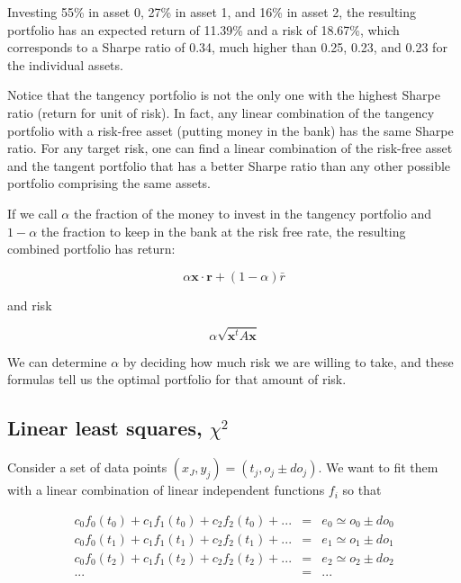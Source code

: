 \documentclass[justified, sixbynine]{tufte-book}
\theoremstyle{plain}%
\newtheorem * {corollary}{Corollary}
\theoremstyle{definition}
\theoremstyle{remark}
\newtheorem * {remark}{Remark}
\newtheorem * {note}{Note}
\begin{document}
\begin{fullwidth}
Investing 55\% in asset 0, 27\% in asset 1, and 16\% in asset 2, the resulting portfolio has an expected return of 11.39\% and a risk of 18.67\%, which corresponds to a Sharpe ratio of 0.34, much higher than 0.25, 0.23, and 0.23 for the individual assets.

Notice that the tangency portfolio is not the only one with the highest Sharpe ratio (return for unit of risk). In fact, any linear combination of the tangency portfolio with a risk-free asset (putting money in the bank) has the same Sharpe ratio. For any target risk, one can find a linear combination of the risk-free asset and the tangent portfolio that has a better Sharpe ratio than any other possible portfolio comprising the same assets.

If we call $\alpha$ the fraction of the money to invest in the tangency portfolio and $1-\alpha$ the fraction to keep in the bank at the risk free rate, the resulting combined portfolio has return:

\begin{equation}
\alpha \mathbf{x}\cdot\mathbf{r} + (1-\alpha) \bar r
\end{equation}

and risk

\begin{equation}
\alpha \sqrt{\mathbf{x}^t A \mathbf{x}}
\end{equation}

We can determine $\alpha$ by deciding how much risk we are willing to take, and these formulas tell us the optimal portfolio for that amount of risk.


\goodbreak\subsection{Linear least squares, $\chi^2$}


Consider a set of data points $(x_J, y_j) = (t_j, o_j \pm do_j)$. We want to fit them with a linear combination of linear independent functions $f_i$ so that

\begin{eqnarray}
c_0 f_0(t_0) + c_1 f_1(t_0) + c_2 f_2(t_0) +  ... & = & e_0 \simeq o_0 \pm do_0\\
c_0 f_0(t_1) + c_1 f_1(t_1) + c_2 f_2(t_1) +  ... & = & e_1 \simeq o_1 \pm do_1\\
c_0 f_0(t_2) + c_1 f_1(t_2) + c_2 f_2(t_2) +  ... & = & e_2 \simeq o_2 \pm do_2\\
... &=& ...
\end{eqnarray}


\end{fullwidth}
\end{document}
